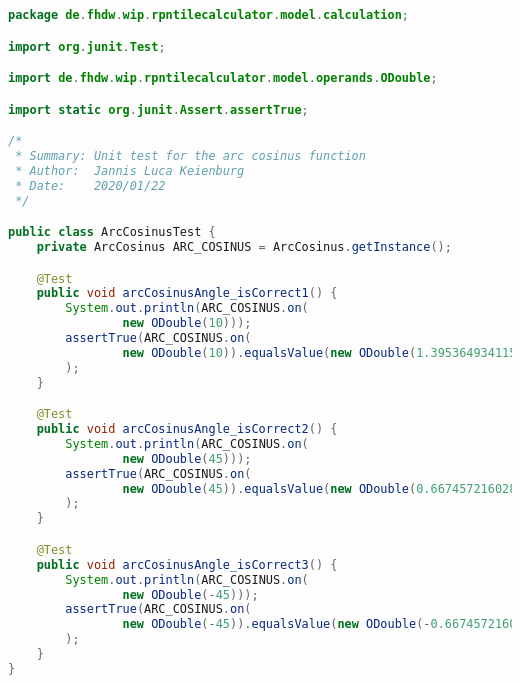 \begin{lstlisting}[caption=ArcCosinusTest (Keienburg),label=list:ArcCosinusTest,language=Java]
package de.fhdw.wip.rpntilecalculator.model.calculation;

import org.junit.Test;

import de.fhdw.wip.rpntilecalculator.model.operands.ODouble;

import static org.junit.Assert.assertTrue;

/*
 * Summary: Unit test for the arc cosinus function
 * Author:  Jannis Luca Keienburg
 * Date:    2020/01/22
 */

public class ArcCosinusTest {
    private ArcCosinus ARC_COSINUS = ArcCosinus.getInstance();

    @Test
    public void arcCosinusAngle_isCorrect1() {
        System.out.println(ARC_COSINUS.on(
                new ODouble(10)));
        assertTrue(ARC_COSINUS.on(
                new ODouble(10)).equalsValue(new ODouble(1.3953649341158527))
        );
    }

    @Test
    public void arcCosinusAngle_isCorrect2() {
        System.out.println(ARC_COSINUS.on(
                new ODouble(45)));
        assertTrue(ARC_COSINUS.on(
                new ODouble(45)).equalsValue(new ODouble(0.6674572160283838))
        );
    }

    @Test
    public void arcCosinusAngle_isCorrect3() {
        System.out.println(ARC_COSINUS.on(
                new ODouble(-45)));
        assertTrue(ARC_COSINUS.on(
                new ODouble(-45)).equalsValue(new ODouble(-0.6674572160283838))
        );
    }
}
\end{lstlisting} 


